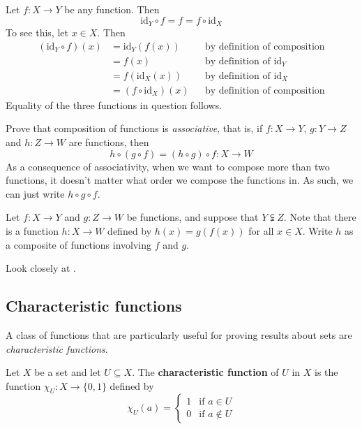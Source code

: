 \begin{example}
\label{exCompositionWithIdentityIsTrivial}
Let $f : X \to Y$ be any function. Then
\[ \mathrm{id}_Y \circ f = f = f \circ \mathrm{id}_X \]
To see this, let $x \in X$. Then
\begin{align*}
(\mathrm{id}_Y \circ f)(x) &= \mathrm{id}_Y(f(x)) && \text{by definition of composition} \\
&= f(x) && \text{by definition of $\mathrm{id}_Y$} \\
&= f(\mathrm{id}_X(x)) && \text{by definition of $\mathrm{id}_X$} \\
&= (f \circ \mathrm{id}_X)(x) && \text{by definition of composition}
\end{align*}
Equality of the three functions in question follows.
\end{example}

\begin{exercise}
\label{exCompositionIsAssociative}
Prove that composition of functions is \textit{associative}, that is, if $f : X \to Y$, $g : Y \to Z$ and $h : Z \to W$ are functions, then
\[ h \circ (g \circ f) = (h \circ g) \circ f : X \to W \]
As a consequence of associativity, when we want to compose more than two functions, it doesn't matter what order we compose the functions in. As such, we can just write $h \circ g \circ f$.
\end{exercise}

\begin{exercise}
\label{exCompositionWithoutMatchingCodomains}
Let $f : X \to Y$ and $g : Z \to W$ be functions, and suppose that $Y \subsetneqq Z$. Note that there is a function $h : X \to W$ defined by $h(x)=g(f(x))$ for all $x \in X$. Write $h$ as a composite of functions involving $f$ and $g$.
\begin{backhint}
Look closely at .
\end{backhint}
\end{exercise}

\subsection*{Characteristic functions}

A class of functions that are particularly useful for proving results about sets are \textit{characteristic functions}.

\begin{definition}
\label{defCharacteristicFunction}
Let $X$ be a set and let $U \subseteq X$. The \textbf{characteristic function} of $U$ in $X$ is the function $\chi_U : X \to \{ 0,1 \}$  defined by
\[ \chi_U(a) = \begin{cases} 1 & \text{if } a \in U \\ 0 & \text{if } a \not\in U \end{cases} \]
\end{definition}

